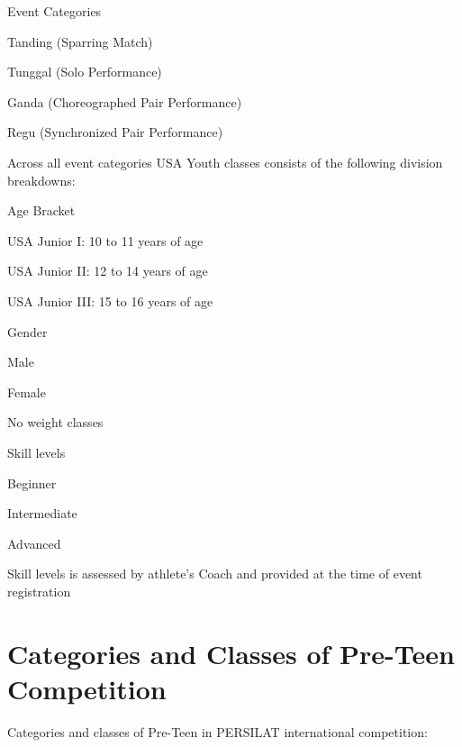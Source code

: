 \begin{legal}
\item Event Categories
    \begin{legal}
    \item Tanding (Sparring Match)
    \item Tunggal (Solo Performance)
    \item Ganda (Choreographed Pair Performance)
    \item Regu (Synchronized Pair Performance)
    \end{legal}
\item Across all event categories USA Youth classes consists of the following division breakdowns:
    \begin{legal}
    \item Age Bracket
        \begin{legal}
        \item USA Junior I: 10 to 11 years of age 
        \item USA Junior II: 12 to 14 years of age 
        \item USA Junior III: 15 to 16 years of age 
        \end{legal}
    \item Gender
        \begin{legal}
        \item Male
        \item Female
        \end{legal}
    \item No weight classes 
    \item Skill levels
        \begin{legal}
        \item Beginner
        \item Intermediate
        \item Advanced
        \end{legal}
    Skill levels is assessed by athlete's Coach and provided at the time of event registration
    \end{legal}


\end{legal}

\section{Categories and Classes of Pre-Teen Competition}
\label{sec:pre_teen}

Categories and classes of Pre-Teen in PERSILAT international competition:

